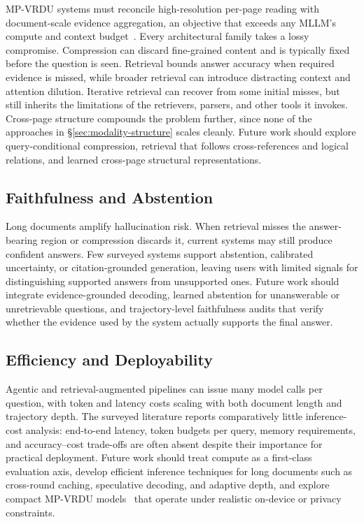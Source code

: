 \documentclass[11pt,twoside,openany]{report}
\begin{document}
MP-VRDU systems must reconcile high-resolution per-page reading with document-scale evidence aggregation, an objective that exceeds any MLLM's compute and context budget~\citep{ma2024mmlongbench}. Every architectural family takes a lossy compromise. Compression can discard fine-grained content and is typically fixed before the question is seen. Retrieval bounds answer accuracy when required evidence is missed, while broader retrieval can introduce distracting context and attention dilution. Iterative retrieval can recover from some initial misses, but still inherits the limitations of the retrievers, parsers, and other tools it invokes. Cross-page structure compounds the problem further, since none of the approaches in \S\ref{sec:modality-structure} scales cleanly. Future work should explore query-conditional compression, retrieval that follows cross-references and logical relations, and learned cross-page structural representations.

\subsection{Faithfulness and Abstention}
\label{sec:conc_faithfulness}

Long documents amplify hallucination risk. When retrieval misses the answer-bearing region or compression discards it, current systems may still produce confident answers. Few surveyed systems support abstention, calibrated uncertainty, or citation-grounded generation, leaving users with limited signals for distinguishing supported answers from unsupported ones. Future work should integrate evidence-grounded decoding, learned abstention for unanswerable or unretrievable questions, and trajectory-level faithfulness audits that verify whether the evidence used by the system actually supports the final answer.

\subsection{Efficiency and Deployability}
\label{sec:conc_efficiency}

Agentic and retrieval-augmented pipelines can issue many model calls per question, with token and latency costs scaling with both document length and trajectory depth. The surveyed literature reports comparatively little inference-cost analysis: end-to-end latency, token budgets per query, memory requirements, and accuracy--cost trade-offs are often absent despite their importance for practical deployment. Future work should treat compute as a first-class evaluation axis, develop efficient inference techniques for long documents such as cross-round caching, speculative decoding, and adaptive depth, and explore compact MP-VRDU models~\citep{hannan2026docslm} that operate under realistic on-device or privacy constraints.
\end{document}
